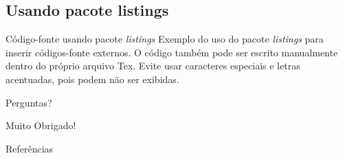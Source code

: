 \documentclass[red]{beamer}
\begin{document}
			\subsection{Usando pacote listings}
				\begin{frame}{Código-fonte usando pacote \textit{listings}}
					Exemplo do uso do pacote \textit{listings} para inserir códigos-fonte externos.
					O código também pode ser escrito manualmente dentro do próprio arquivo Tex.
					Evite usar caracteres especiais e letras acentuadas, pois podem não ser exibidas.
				
					
				\end{frame}				
	
	\begin{frame}
		\label{perg}
		\begin{center} 
			\Huge Perguntas?
		\end{center} 
	\end{frame}
	
	\begin{frame}
		\begin{center} 
			\Huge Muito Obrigado!
		\end{center} 
	\end{frame}
	
	
	\begin{frame}{Referências}
		\nocite{Tantau2015,Cassidy2013}
	\end{frame}
	
\end{document}
